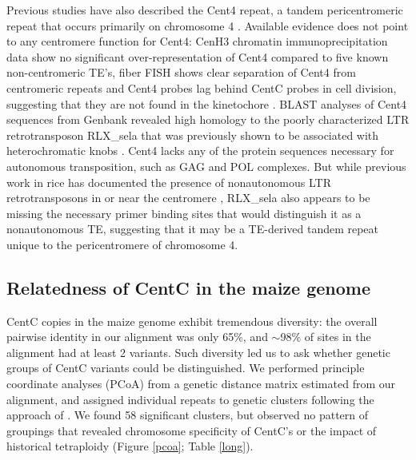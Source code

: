 Previous studies have also described the Cent4 repeat, a tandem pericentromeric repeat that occurs primarily on chromosome 4 \citep{Page2001}. 
Available evidence does not point to any centromere function for Cent4: CenH3 chromatin immunoprecipitation data \citep{Wolfgruber2009, jin2004maize} show no significant over-representation of Cent4 compared to five known non-centromeric TE’s, fiber FISH shows clear separation of Cent4 from centromeric repeats \citep{jin2004maize} and Cent4 probes lag behind CentC probes in cell division, suggesting that they are not found in the kinetochore \citep{Jiang2002, jin2004maize}. 
BLAST analyses of Cent4 sequences from Genbank revealed high homology to the poorly characterized LTR retrotransposon RLX\_sela that was previously shown to be associated with heterochromatic  knobs \citep{Tenaillon2011, Chia2012}.  
Cent4 lacks any of the protein sequences necessary for autonomous transposition, such as GAG and POL complexes.  
But while previous work in rice has documented the presence of nonautonomous LTR retrotransposons  in or near the centromere \citep{Jiang2002}, RLX\_sela also appears to be missing the necessary primer binding sites that would distinguish it as a nonautonomous TE, suggesting that it may be a TE-derived tandem repeat unique to the pericentromere of chromosome 4. 

\subsection*{Relatedness of CentC in the maize genome}

CentC copies in the maize genome exhibit tremendous diversity: the overall pairwise identity in our alignment was only 65\%, and $\sim$98\% of sites in the alignment had at least 2 variants.  
Such diversity led us to ask whether genetic groups of CentC variants could be distinguished. 
We performed principle coordinate analyses (PCoA) from a genetic distance matrix estimated from our alignment, and assigned individual repeats to  genetic clusters following the approach of \citet{Patterson2006}.  
We found 58 significant clusters, but observed no pattern of groupings that revealed chromosome specificity of CentC’s or the impact of historical tetraploidy (Figure \ref{pcoa}; Table \ref{long}).

